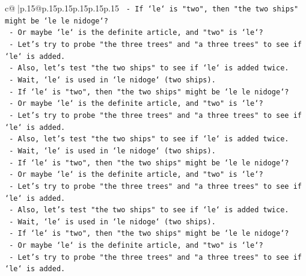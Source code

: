 \documentclass{article}
\begin{document}
{\begin{supertabular}{c@{$\;$}|p{.15\linewidth}@{}p{.15\linewidth}p{.15\linewidth}p{.15\linewidth}p{.15\linewidth}p{.15\linewidth}}
{{{\texttt{                           {-} If `le` is "two", then "the two ships" might be `le le nidoge`?} \\
\texttt{                           {-} Or maybe `le` is the definite article, and "two" is `le`?} \\
\texttt{                           {-} Let's try to probe "the three trees" and "a three trees" to see if `le` is added.} \\
\texttt{                           {-} Also, let's test "the two ships" to see if `le` is added twice.} \\
\texttt{                           {-} Wait, `le` is used in `le nidoge` (two ships).} \\
\texttt{                           {-} If `le` is "two", then "the two ships" might be `le le nidoge`?} \\
\texttt{                           {-} Or maybe `le` is the definite article, and "two" is `le`?} \\
\texttt{                           {-} Let's try to probe "the three trees" and "a three trees" to see if `le` is added.} \\
\texttt{                           {-} Also, let's test "the two ships" to see if `le` is added twice.} \\
\texttt{                           {-} Wait, `le` is used in `le nidoge` (two ships).} \\
\texttt{                           {-} If `le` is "two", then "the two ships" might be `le le nidoge`?} \\
\texttt{                           {-} Or maybe `le` is the definite article, and "two" is `le`?} \\
\texttt{                           {-} Let's try to probe "the three trees" and "a three trees" to see if `le` is added.} \\
\texttt{                           {-} Also, let's test "the two ships" to see if `le` is added twice.} \\
\texttt{                           {-} Wait, `le` is used in `le nidoge` (two ships).} \\
\texttt{                           {-} If `le` is "two", then "the two ships" might be `le le nidoge`?} \\
\texttt{                           {-} Or maybe `le` is the definite article, and "two" is `le`?} \\
\texttt{                           {-} Let's try to probe "the three trees" and "a three trees" to see if `le` is added.} \\
}}}
\end{supertabular}}
\end{document}
